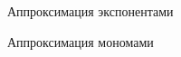 \documentclass[a4paper, 12pt]{article}
\begin{document}
\begin{figure}[h!]
  \noindent{}
 \caption{Аппроксимация экспонентами}
  \label{expex}
\end{figure}

\begin{figure}[h!]
    \noindent{}
   \caption{Аппроксимация мономами}
    \label{mon}
\end{figure} 
\end{document}
